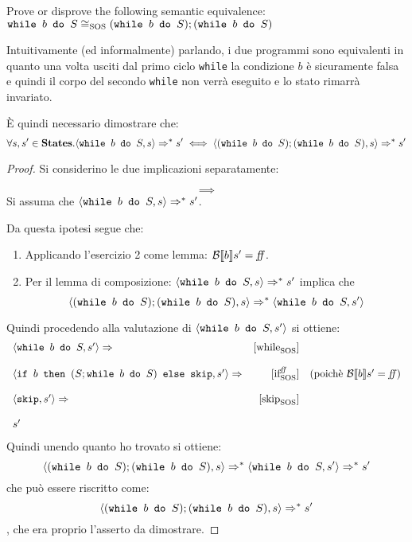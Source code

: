 {Prove or disprove the following semantic equivalence: \vspace{.7em} \\
$\wbS{b}{S} \eqSOS (\wbS{b}{S}); (\wbS{b}{S})$
}
{

Intuitivamente (ed informalmente) parlando, i due programmi sono equivalenti in
quanto una volta usciti dal primo ciclo \texttt{while} la condizione $b$ è
sicuramente falsa e quindi il corpo del secondo \texttt{while} non verrà
eseguito e lo stato rimarrà invariato.
\vspace{10pt}



È quindi necessario dimostrare che:
$$
\forall s,s' \in \states.
	\confSs{\wbS{b}{S}}{s} \Rar{*} s'
	\iff
	\confSs{(\wbS{b}{S}); (\wbS{b}{S})}{s} \Rar{*} s'
$$
\begin{proof} Si considerino le due implicazioni separatamente:

\vspace{10pt}
$$\boxed{\implies}$$
Si assuma che $\confSs{\wbS{b}{S}}{s} \Rar{*} s'$.

Da questa ipotesi segue che:
\begin{enumerate}
 \item Applicando l'esercizio 2 come lemma: $\B{b}' = \semfalse$. 
 \item Per il lemma di composizione: $\confSs{\wbS{b}{S}}{s} \Rar{*} s'$
 implica che
 $$\confSs{(\wbS{b}{S}); (\wbS{b}{S})}{s} \Rar{*} \confSs{\wbS{b}{S}}{s'}$$
\end{enumerate}
Quindi procedendo alla valutazione di $\confSs{\wbS{b}{S}}{s'}$ si ottiene:
$$
\begin{array}{lrr}
\confSs{\wbS{b}{S}}{s'} \Rar{} & \whileSOS & \\
& &\\
\confSs{\ifABC{b}{(S; \wbS{b}{S})}{\skipForFriends}}{s'} \Rar{} & \ifffSOS & (\text{poichè }\B{b}' = \semfalse)\\
& &\\
\confSs{\skipForFriends}{s'} \Rar{} & \skipSOS\\
& &\\
s' &\\
\end{array}
$$
Quindi unendo quanto ho trovato si ottiene:
$$
\confSs{(\wbS{b}{S}); (\wbS{b}{S})}{s} \Rar{*} \confSs{\wbS{b}{S}}{s'} \Rar{*} s'
$$
che può essere riscritto come:
$$\confSs{(\wbS{b}{S}); (\wbS{b}{S})}{s} \Rar{*} s'$$
, che era proprio l'asserto da dimostrare.
\vspace{10pt}



\end{proof}}
